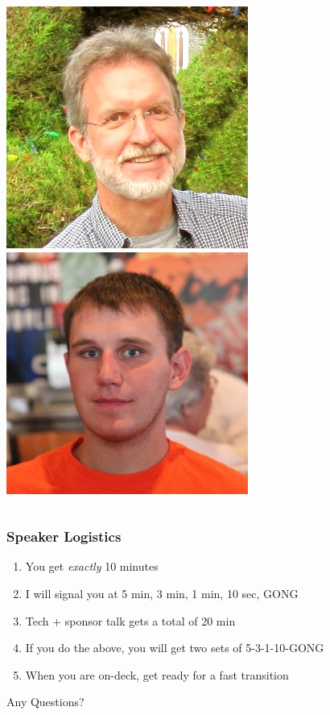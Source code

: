 \documentclass[xcolor=dvipsnames,red]{beamer}
\begin{document}
\begin{frame}
\begin{columns}
\begin{column}{.25\textwidth}
\includegraphics[width=.75\textwidth]{imgs/dan_williams.jpg}\\
\vspace{.2 cm}
\includegraphics[width=.75\textwidth]{imgs/justin_campbell.jpg}
\end{column}
\end{columns}

\end{frame}

\begin{frame}
\frametitle{Speaker Logistics}
\begin{enumerate}
\item You get {\em exactly} 10 minutes
\item I will signal you at 5 min, 3 min, 1 min, 10 sec, GONG
\item Tech + sponsor talk gets a total of 20 min
\item If you do the above, you will get two sets of 5-3-1-10-GONG
\item When you are on-deck, get ready for a fast transition
\end{enumerate}

Any Questions?
\end{frame}
\end{document}
